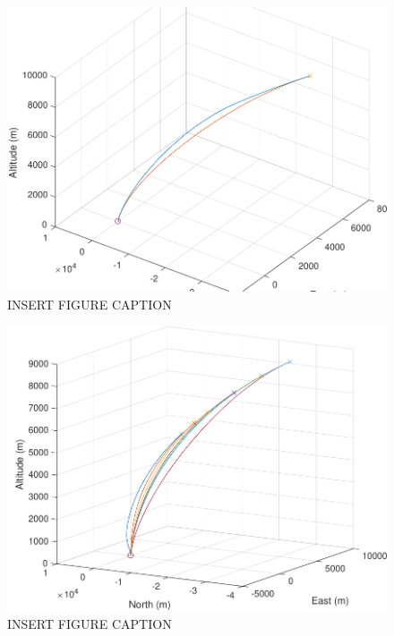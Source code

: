 \begin{figure}[H]
	\centering
	\begin{minipage}{4.5 in}
		\includegraphics[width=\linewidth]{Figures/trajatmovsvac.pdf}
		\caption{INSERT FIGURE CAPTION \label{fig:trajatmovsvac} }
	\end{minipage}
\end{figure}



\begin{figure}[H]
	\centering
	\begin{minipage}{4.5 in}
		\includegraphics[width=\linewidth]{Figures/trajpowatmo.pdf}
		\caption{INSERT FIGURE CAPTION \label{fig:trajpowatmo} }
	\end{minipage}
\end{figure}











